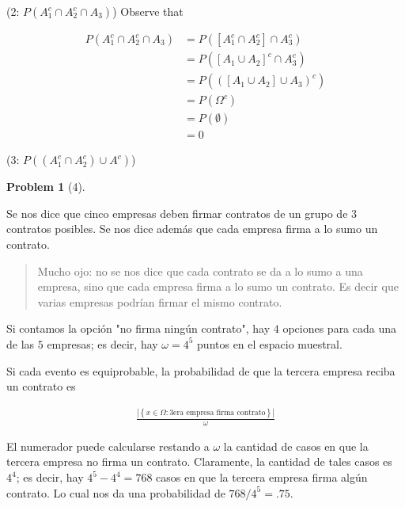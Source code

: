 \documentclass[a4paper, 12pt]{article}
\newtheorem{problem}{Problem}
\newtheorem{problem}{Problem}
\begin{document}
    (2: $P(A_1^c \cap A_2^c \cap A_3)$) Observe that 

    \begin{align*}
        P(A_1^c \cap A_2^c \cap A_3) &= P( \left[ A_1^c \cap A_2^c \right] \cap A_3^c ) \\ 
                                     &= P(\left[ A_1 \cup A_2 \right]^c \cap A_3^c )\\ 
                                     &=P(( \left[ A_1 \cup A_2 \right] \cup A_3 )^c ) \\ 
                                     &= P(\Omega^c) \\ 
                                     &= P(\emptyset) \\ 
                                     &= 0
    \end{align*}


    (3: $P( (A_1^c \cap A_2^c) \cup A^c )$)

    \pagebreak 

    \begin{problem}[4]
        
    \end{problem}

    Se nos dice que cinco empresas deben firmar contratos de un grupo de $3$ 
    contratos posibles. Se nos dice además que cada empresa firma a lo sumo 
    un contrato. 

    
    \small
    \begin{quote}
    
    Mucho ojo: no se nos dice que cada contrato se da a lo sumo a una empresa, sino que 
    cada empresa firma a lo sumo un contrato. Es decir que varias empresas podrían firmar 
    el mismo contrato.
    \end{quote}
    \normalsize

    Si contamos la opción "no firma ningún contrato", hay $4$ opciones para cada 
    una de las $5$ empresas; es decir, hay $\omega = 4^5$ puntos en el espacio 
    muestral.

    Si cada evento es equiprobable, la probabilidad de que la tercera empresa
    reciba un contrato es 

    \begin{align*} \frac{| \left\{ x \in \Omega : 3\text{era empresa firma
    contrato} \right\}  |}{\omega} \end{align*}

    El numerador puede calcularse restando a $\omega$ la cantidad de casos en que 
    la tercera empresa no firma un contrato. Claramente, la cantidad de tales 
    casos es $4^4$; es decir, hay $4^5 - 4^4 = 768$ casos en que 
    la tercera empresa firma algún contrato. Lo cual nos da una probabilidad 
    de $768 / 4^5 = .75$.
\end{document}
